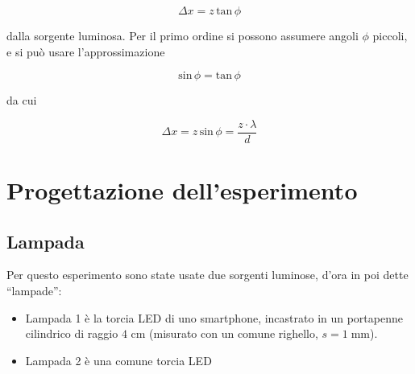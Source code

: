 \documentclass{article}
\begin{document}
\[\Delta x = z\, \textrm{tan} \, \phi\]

dalla sorgente luminosa. Per il primo ordine si possono assumere angoli $\phi$ piccoli, e si può usare l'approssimazione

\[\textrm{sin} \, \phi =\textrm{tan} \, \phi\]

da cui 

\begin{equation}
\Delta x = z\, \textrm{sin} \, \phi = \frac{z \cdot \lambda}{d}
\end{equation}

\section{Progettazione dell'esperimento}

\subsection{Lampada}

Per questo esperimento sono state usate due sorgenti luminose, d'ora in poi dette ``lampade'':

\begin{itemize}
  \item Lampada 1 è la torcia LED di uno smartphone, incastrato in un portapenne cilindrico di raggio $4$ cm (misurato con un comune righello, $s = 1 \; \textrm{mm}$).
  \item Lampada 2 è una comune torcia LED
\end{itemize}
\end{document}
